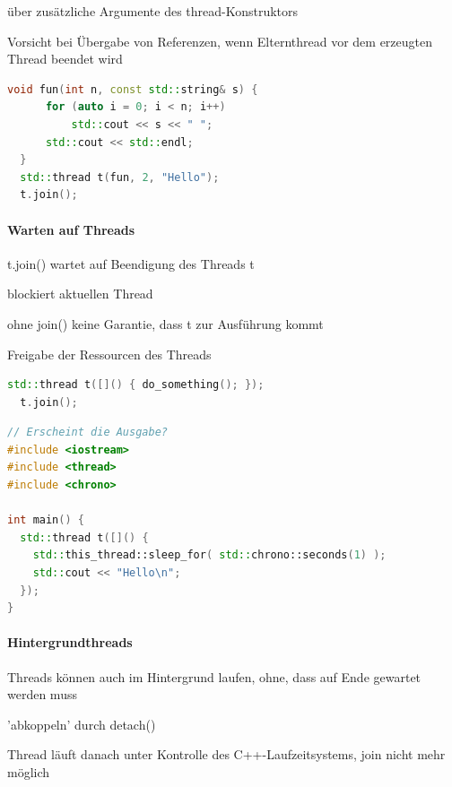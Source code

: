 \documentclass[10pt]{article}
\begin{document}
  \begin{itemize*}
    \item über zusätzliche Argumente des thread-Konstruktors
    \item Vorsicht bei Übergabe von Referenzen, wenn Elternthread vor dem erzeugten Thread beendet wird
  \end{itemize*}
  \begin{lstlisting}[language=C++]
  void fun(int n, const std::string& s) {
      for (auto i = 0; i < n; i++)
          std::cout << s << " ";
      std::cout << std::endl;
  }
  std::thread t(fun, 2, "Hello");
  t.join();
  \end{lstlisting}
  
  \paragraph{Warten auf Threads}
  
  \begin{itemize*}
    \item t.join() wartet auf Beendigung des Threads t
    \item blockiert aktuellen Thread
    \item ohne join() keine Garantie, dass t zur Ausführung kommt
    \item Freigabe der Ressourcen des Threads
  \end{itemize*}
  \begin{lstlisting}[language=C++]
  std::thread t([]() { do_something(); });
  t.join();
\end{lstlisting}
  \begin{lstlisting}[language=C++]
// Erscheint die Ausgabe?
#include <iostream>
#include <thread>
#include <chrono>

int main() {
  std::thread t([]() {
    std::this_thread::sleep_for( std::chrono::seconds(1) );
    std::cout << "Hello\n";
  });
}
\end{lstlisting}
  
  \paragraph{Hintergrundthreads}
  
  \begin{itemize*}
    \item Threads können auch im Hintergrund laufen, ohne, dass auf Ende gewartet werden muss
    \item 'abkoppeln' durch detach()
    \item Thread läuft danach unter Kontrolle des C++-Laufzeitsystems, join nicht mehr möglich
  \end{itemize*}
  
\end{document}
